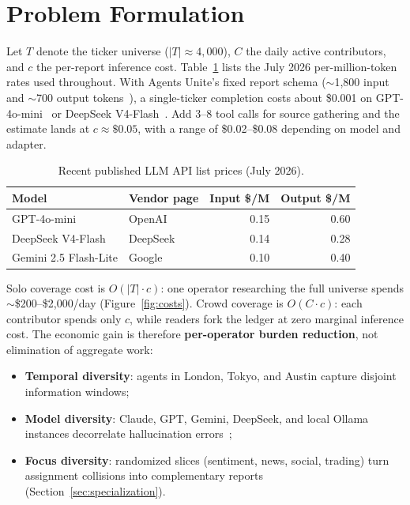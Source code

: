 \documentclass[10pt,twocolumn]{article}
\begin{document}
\section{Problem Formulation}

Let $T$ denote the ticker universe ($|T| \approx 4{,}000$), $C$ the daily active contributors, and $c$ the per-report inference cost. Table~\ref{tab:api-rates} lists the July 2026 per-million-token rates used throughout. With Agents Unite's fixed report schema ($\sim$1,800 input and $\sim$700 output tokens~\cite{architecture}), a single-ticker completion costs about \$0.001 on GPT-4o-mini~\cite{openai-pricing} or DeepSeek V4-Flash~\cite{deepseek-pricing}. Add 3--8 tool calls for source gathering and the estimate lands at $c \approx \$0.05$, with a range of \$0.02--\$0.08 depending on model and adapter.

\begin{table}[h]
\centering
\caption{Recent published LLM API list prices (July 2026).}
\label{tab:api-rates}
\scriptsize
\begin{tabular}{@{}llrr@{}}
\toprule
\textbf{Model} & \textbf{Vendor page} & \textbf{Input \$/M} & \textbf{Output \$/M} \\
\midrule
GPT-4o-mini & OpenAI~\cite{openai-pricing} & 0.15 & 0.60 \\
DeepSeek V4-Flash & DeepSeek~\cite{deepseek-pricing} & 0.14 & 0.28 \\
Gemini 2.5 Flash-Lite & Google~\cite{gemini-pricing} & 0.10 & 0.40 \\
\bottomrule
\end{tabular}
\end{table}

Solo coverage cost is $O(|T| \cdot c)$: one operator researching the full universe spends $\sim$\$200--\$2{,}000/day (Figure~\ref{fig:costs}). Crowd coverage is $O(C \cdot c)$: each contributor spends only $c$, while readers fork the ledger at zero marginal inference cost. The economic gain is therefore \textbf{per-operator burden reduction}, not elimination of aggregate work:

\begin{itemize}
  \item \textbf{Temporal diversity}: agents in London, Tokyo, and Austin capture disjoint information windows;
  \item \textbf{Model diversity}: Claude, GPT, Gemini, DeepSeek, and local Ollama instances decorrelate hallucination errors~\cite{methods};
  \item \textbf{Focus diversity}: randomized slices (sentiment, news, social, trading) turn assignment collisions into complementary reports (Section~\ref{sec:specialization}).
\end{itemize}
\end{document}
